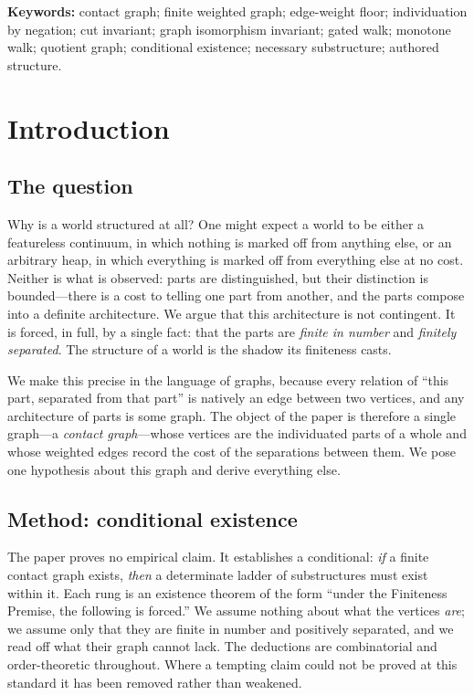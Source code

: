 \documentclass[11pt,a4paper]{article}
\theoremstyle{thmstyle}
\theoremstyle{definition}
\theoremstyle{remark}
\begin{document}
\noindent\textbf{Keywords:} contact graph; finite weighted graph; edge-weight
floor; individuation by negation; cut invariant; graph isomorphism invariant;
gated walk; monotone walk; quotient graph; conditional existence; necessary
substructure; authored structure.

\tableofcontents

\section{Introduction}
\label{sec:intro}

\subsection{The question}

Why is a world structured at all? One might expect a world to be either a
featureless continuum, in which nothing is marked off from anything else, or an
arbitrary heap, in which everything is marked off from everything else at no
cost. Neither is what is observed: parts are distinguished, but their
distinction is bounded---there is a cost to telling one part from another, and
the parts compose into a definite architecture. We argue that this architecture
is not contingent. It is forced, in full, by a single fact: that the parts are
\emph{finite in number} and \emph{finitely separated}. The structure of a world
is the shadow its finiteness casts.

We make this precise in the language of graphs, because every relation of
``this part, separated from that part'' is natively an edge between two
vertices, and any architecture of parts is some graph. The object of the paper
is therefore a single graph---a \emph{contact graph}---whose vertices are the
individuated parts of a whole and whose weighted edges record the cost of the
separations between them. We pose one hypothesis about this graph and derive
everything else.

\subsection{Method: conditional existence}

The paper proves no empirical claim. It establishes a conditional: \emph{if} a
finite contact graph exists, \emph{then} a determinate ladder of substructures
must exist within it. Each rung is an existence theorem of the form ``under the
Finiteness Premise, the following is forced.'' We assume nothing about what the
vertices \emph{are}; we assume only that they are finite in number and
positively separated, and we read off what their graph cannot lack. The
deductions are combinatorial and order-theoretic throughout. Where a tempting
claim could not be proved at this standard it has been removed rather than
weakened.
\end{document}

